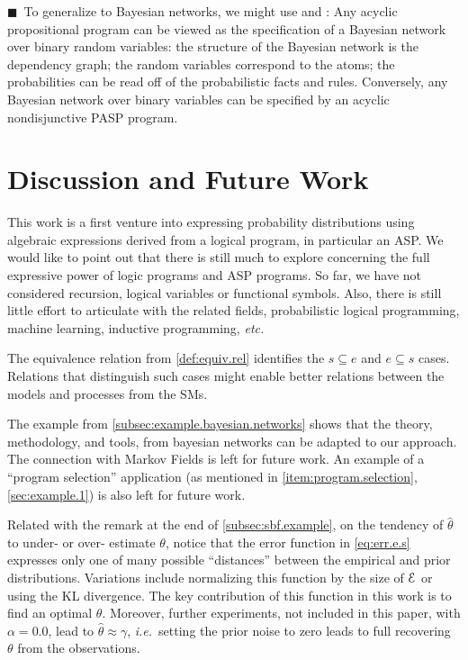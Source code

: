 \documentclass{article}
\newcommand{\cla}[1]{\ensuremath{{\cal #1}}}
\newcommand{\EVENTSset}{\ensuremath{\cla{E}}}
\newcommand{\LOOK}{\ensuremath{\blacksquare}}
\newcommand{\franc}[1]{{\color{green!30!black}#1}}
\newcounter{remark}
\begin{document}
\franc{\LOOK~To generalize to Bayesian networks, we might use
  \cite{cozman2020joy,raedt2016statistical} and
  \cite{kiessling1992database,thone1997increased}: Any acyclic
  propositional program can be viewed as the specification of a
  Bayesian network over binary random variables: the structure of the
  Bayesian network is the dependency graph; the random variables
  correspond to the atoms; the probabilities can be read off of the
  probabilistic facts and rules.  Conversely, any Bayesian network
  over binary variables can be specified by an acyclic nondisjunctive
  PASP program.}
%
%
%
\section{Discussion and Future Work}
%
%
%
This work is a first venture into expressing probability distributions
using algebraic expressions derived from a logical program, in
particular an \ac{ASP}.  We would like to point out that there is
still much to explore concerning the full expressive power of logic
programs and \ac{ASP} programs.  So far, we have not considered
recursion, logical variables or functional symbols.  Also, there is
still little effort to articulate with the related fields,
probabilistic logical programming, machine learning, inductive
programming, \emph{etc.}

The equivalence relation from \cref{def:equiv.rel} identifies the
$s \subseteq e$ and $e \subseteq s$ cases.  Relations that distinguish
such cases might enable better relations between the models and
processes from the \aclp{SM}.

The example from \cref{subsec:example.bayesian.networks} shows that
the theory, methodology, and tools, from bayesian networks can be
adapted to our approach.  The connection with Markov Fields
\cite{kindermann80} is left for future work.  An example of a
``program selection'' application (as mentioned in
\cref{item:program.selection}, \cref{sec:example.1}) is also left for
future work.

Related with the remark at the end of \cref{subsec:sbf.example}, on
the tendency of $\hat{\theta}$ to under- or over- estimate $\theta$,
notice that the error function in \eqref{eq:err.e.s} expresses only
one of many possible ``distances'' between the empirical and prior
distributions.  Variations include normalizing this function by the
size of $\EVENTSset$ or using the \acl{KL} divergence.  The key
contribution of this function in this work is to find an optimal
$\theta$.  Moreover, further experiments, not included in this paper,
with $\alpha = 0.0$, lead to $\hat{\theta} \approx \gamma$,
\emph{i.e.}\ setting the prior noise to zero leads to full recovering
$\theta$ from the observations.
\end{document}
